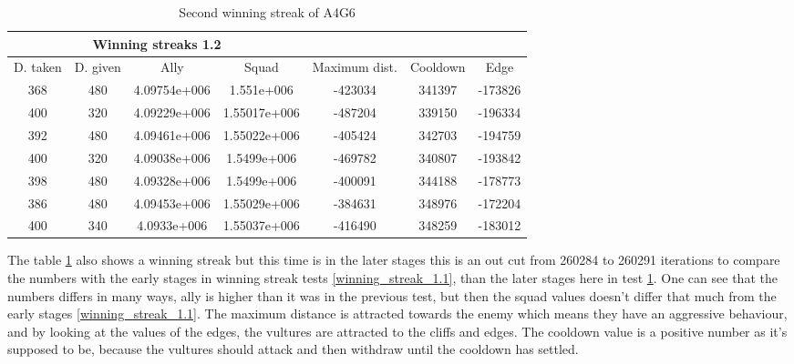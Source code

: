 \begin{centering}
\begin{table}
 \begin{tabular}{|c||c|c|c|c|c|c|}
	\multicolumn{4}{c}{Winning streaks 1.2} \\
	\hline
	D. taken & 				D. given & 			Ally & 			Squad & 			Maximum dist. & 			Cooldown & 				Edge \\
	\hline
	368& 								480& 					4.09754e+006&	1.551e+006&		-423034&							341397&				-173826\\
	400& 								320& 					4.09229e+006&	1.55017e+006&	-487204&							339150&				-196334\\
	392& 								480& 					4.09461e+006&	1.55022e+006&	-405424&							342703&				-194759\\
	400& 								320& 					4.09038e+006&	1.5499e+006&		-469782&							340807&				-193842\\
	398& 								480& 					4.09328e+006&	1.5499e+006&		-400091&							344188&				-178773\\
	386& 								480& 					4.09453e+006&	1.55029e+006&	-384631&							348976&				-172204\\
	400&		 							340&						4.0933e+006&		1.55037e+006&	-416490&							348259&				-183012\\

	\hline

\end{tabular}
	\caption{Second winning streak of A4G6}
	\label{winning_streak_1.2}
\end{table}
\end{centering}
The table \ref{winning_streak_1.2} also shows a winning streak but this time is in the later stages this is an out cut from 260284 to 260291 iterations to compare the numbers with the early stages in winning streak tests \ref{winning_streak_1.1}, than the later stages here in test \ref{winning_streak_1.2}. One can see that the numbers differs in many ways, ally is higher than it was in the previous test, but then the squad values doesn't differ that much from the early stages \ref{winning_streak_1.1}. The maximum distance is attracted towards the enemy which means they have an aggressive behaviour, and by looking at the values of the edges, the vultures are attracted to the cliffs and edges. The cooldown value is a positive number as it's supposed to be, because the vultures should attack and then withdraw until the cooldown has settled.

